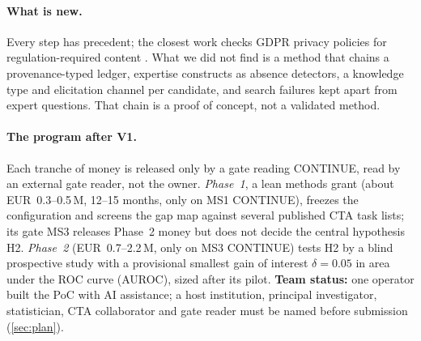 \paragraph{What is new.} \evint{} Every step has precedent; the closest work checks GDPR privacy
policies for regulation-required content \parencite{torre2020ai}. What we did not find is a method
that chains a provenance-typed ledger, expertise constructs as absence detectors, a knowledge type
and elicitation channel per candidate, and search failures kept apart from expert questions. That
chain is a proof of concept, not a validated method.

\paragraph{The program after V1.} \evfut{} Each tranche of money is released only by a gate reading
CONTINUE, read by an external gate reader, not the owner. \emph{Phase~1}, a lean methods grant (about
EUR~0.3--0.5\,M, 12--15 months, only on MS1 CONTINUE), freezes the configuration and screens the gap
map against several published CTA task lists; its gate MS3 releases Phase~2 money but does not decide
the central hypothesis H2. \emph{Phase~2} (EUR~0.7--2.2\,M, only on MS3 CONTINUE) tests H2 by a
blind prospective study with a provisional smallest gain of interest $\delta = 0.05$ in area under the
ROC curve (AUROC), sized after its pilot. \textbf{Team
status:} one operator built the PoC with AI assistance; a host institution, principal investigator,
statistician, CTA collaborator and gate reader must be named before submission (\cref{sec:plan}).
